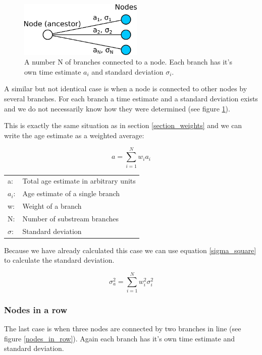 \begin{figure}[ht]
\centering
\includegraphics[width=5.9cm]{img/node_with_branches.png}
\caption{\label{node_with_branches} A number N of branches
connected to a node. Each branch has it's own time estimate
$a_i$ and standard deviation $\sigma_i$.}
\end{figure}

A similar but not identical case is when a node is connected
to other nodes by several branches. For each branch a time
estimate and a standard deviation exists and we do not necessarily
know how they were determined (see figure \ref{node_with_branches}).

This is exactly the same situation as in section \ref{section_weights}
and we can write the age estimate as a weighted average:

\begin{equation}
a = \sum_{i = 1}^{N} w_i a_i
\end{equation}

\begin{tabular}{ll}
a: &  Total age estimate in arbitrary units\\
$a_i$: &  Age estimate of a single branch\\
w: &  Weight of a branch\\
N: &  Number of substream branches\\
$\sigma$: & Standard deviation
\end{tabular}
\vspace{1em}

Because we have already calculated this case we can use
equation \ref{sigma_square} to calculate the standard
deviation.

\begin{equation}
\sigma_a^2 = \sum_{i = 1}^{N} w_i^2 \sigma_i^2 
\end{equation}


\subsubsection*{Nodes in a row}

The last case is when three nodes are connected by
two branches in line (see figure \ref{nodes_in_row}).
Again each branch has it's own time estimate and
standard deviation. 

